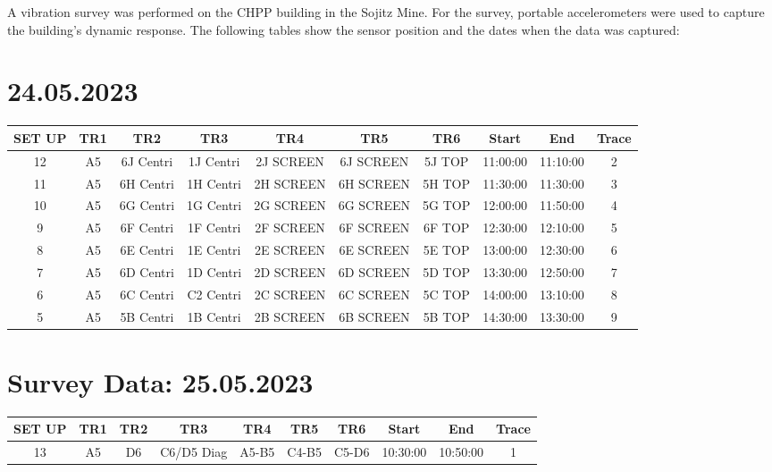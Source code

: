 \documentclass[8pt]{article}
\begin{document}
A vibration survey was performed on the CHPP building in the Sojitz Mine. For the survey, portable accelerometers were used to capture the building's dynamic response. The following tables show the sensor position and the dates when the data was captured:
\section*{24.05.2023}
\begin{tabular}{|c|c|c|c|c|c|c|c|c|c|}
\hline
SET UP & TR1 & TR2 & TR3 & TR4 & TR5 & TR6 & Start & End & Trace\\
\hline
12 & A5 & 6J  Centri & 1J  Centri & 2J  SCREEN & 6J  SCREEN & 5J  TOP & 11:00:00 & 11:10:00 & 2\\
11 & A5 & 6H  Centri & 1H  Centri & 2H  SCREEN & 6H  SCREEN & 5H  TOP & 11:30:00 & 11:30:00 & 3\\
10 & A5 & 6G  Centri & 1G  Centri & 2G  SCREEN & 6G  SCREEN & 5G  TOP & 12:00:00 & 11:50:00 & 4\\
9 & A5 & 6F  Centri & 1F  Centri & 2F  SCREEN & 6F  SCREEN & 6F  TOP & 12:30:00 & 12:10:00 & 5\\
8 & A5 & 6E  Centri & 1E  Centri & 2E  SCREEN & 6E  SCREEN & 5E  TOP & 13:00:00 & 12:30:00 & 6\\
7 & A5 & 6D  Centri & 1D  Centri & 2D  SCREEN & 6D  SCREEN & 5D  TOP & 13:30:00 & 12:50:00 & 7\\
6 & A5 & 6C  Centri & C2  Centri & 2C  SCREEN & 6C  SCREEN & 5C  TOP & 14:00:00 & 13:10:00 & 8\\
5 & A5 & 5B  Centri & 1B  Centri & 2B  SCREEN & 6B  SCREEN & 5B  TOP & 14:30:00 & 13:30:00 & 9\\
\hline
\end{tabular}
\section*{Survey Data: 25.05.2023}
\begin{tabular}{|c|c|c|c|c|c|c|c|c|c|}
\hline
SET UP & TR1 & TR2 & TR3 & TR4 & TR5 & TR6 & Start & End & Trace\\
\hline
13 & A5 & D6 & C6/D5 Diag & A5-B5 & C4-B5 & C5-D6 & 10:30:00 & 10:50:00 & 1\\
\hline
\end{tabular}
\end{document}
